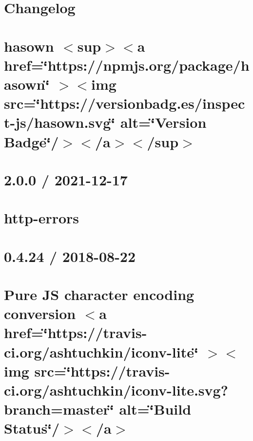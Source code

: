 \documentclass[twoside]{book}
\newcommand{\+}{\discretionary{\mbox{\scriptsize$\hookleftarrow$}}{}{}}
\begin{document}
\chapter{Changelog}
\label{md_Backend_nodejs_node_modules_hasown_CHANGELOG}

\chapter{hasown \texorpdfstring{$<$}{<}sup\texorpdfstring{$>$}{>}\texorpdfstring{$<$}{<}a href=\char`\"{}https\+://npmjs.\+org/package/hasown\char`\"{} \texorpdfstring{$>$}{>}\texorpdfstring{$<$}{<}img src=\char`\"{}https\+://versionbadg.\+es/inspect-\/js/hasown.\+svg\char`\"{} alt=\char`\"{}\+Version Badge\char`\"{}/\texorpdfstring{$>$}{>}\texorpdfstring{$<$}{<}/a\texorpdfstring{$>$}{>}\texorpdfstring{$<$}{<}/sup\texorpdfstring{$>$}{>}}
\label{md_Backend_nodejs_node_modules_hasown_README}

\chapter{2.0.0 / 2021-\/12-\/17}
\label{md_Backend_nodejs_node_modules_http_errors_HISTORY}

\chapter{http-\/errors}
\label{md_Backend_nodejs_node_modules_http_errors_README}

\chapter{0.4.24 / 2018-\/08-\/22}
\label{md_Backend_nodejs_node_modules_iconv_lite_Changelog}

\chapter{Pure JS character encoding conversion \texorpdfstring{$<$}{<}a href=\char`\"{}https\+://travis-\/ci.\+org/ashtuchkin/iconv-\/lite\char`\"{} \texorpdfstring{$>$}{>}\texorpdfstring{$<$}{<}img src=\char`\"{}https\+://travis-\/ci.\+org/ashtuchkin/iconv-\/lite.\+svg?branch=master\char`\"{} alt=\char`\"{}\+Build Status\char`\"{}/\texorpdfstring{$>$}{>}\texorpdfstring{$<$}{<}/a\texorpdfstring{$>$}{>}}
\label{md_Backend_nodejs_node_modules_iconv_lite_README}

\end{document}
